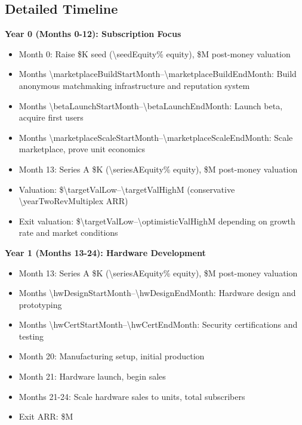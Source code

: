 \subsection{Detailed Timeline}

\textbf{Year 0 (Months 0-12): Subscription Focus}
\begin{itemize}
  \item Month 0: Raise \$K seed (\num{\seedEquity}\% equity), \$M post-money valuation
  \item Months \num{\marketplaceBuildStartMonth}--\num{\marketplaceBuildEndMonth}: Build anonymous matchmaking infrastructure and reputation system
  \item Months \num{\betaLaunchStartMonth}--\num{\betaLaunchEndMonth}: Launch beta, acquire first \numint{\betaUsers} users
  \item Months \num{\marketplaceScaleStartMonth}--\num{\marketplaceScaleEndMonth}: Scale marketplace, prove unit economics
  \item Month 13: Series A \$K (\num{\seriesAEquity}\% equity), \$M post-money valuation
  \item Valuation: \$\num{\targetValLow}--\num{\targetValHigh}M (conservative \num{\yearTwoRevMultiple}x ARR)
  \item Exit valuation: \$\num{\targetValLow}--\num{\optimisticValHigh}M depending on growth rate and market conditions
\end{itemize}

\textbf{Year 1 (Months 13-24): Hardware Development}
\begin{itemize}
  \item Month 13: Series A \$K (\num{\seriesAEquity}\% equity), \$M post-money valuation
  \item Months \num{\hwDesignStartMonth}--\num{\hwDesignEndMonth}: Hardware design and prototyping
  \item Months \num{\hwCertStartMonth}--\num{\hwCertEndMonth}: Security certifications and testing
  \item Month 20: Manufacturing setup, initial production
  \item Month 21: Hardware launch, begin sales
  \item Months 21-24: Scale hardware sales to \numint{\hwCustomersYearTwo} units, \numint{\totalSubsYearTwo} total subscribers
  \item Exit ARR: \$M
\end{itemize}

